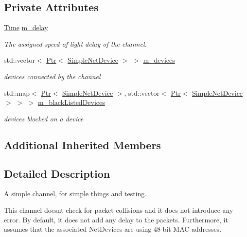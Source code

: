 \subsection*{Private Attributes}
\begin{DoxyCompactItemize}
\item 
\hyperlink{classns3_1_1Time}{Time} \hyperlink{classns3_1_1SimpleChannel_ada64a5f43714383448147d577bd8d619}{m\+\_\+delay}
\begin{DoxyCompactList}\small\item\em The assigned speed-\/of-\/light delay of the channel. \end{DoxyCompactList}\item 
std\+::vector$<$ \hyperlink{classns3_1_1Ptr}{Ptr}$<$ \hyperlink{classns3_1_1SimpleNetDevice}{Simple\+Net\+Device} $>$ $>$ \hyperlink{classns3_1_1SimpleChannel_a70203624f45f2aae03d9ae6294f6c4ce}{m\+\_\+devices}
\begin{DoxyCompactList}\small\item\em devices connected by the channel \end{DoxyCompactList}\item 
std\+::map$<$ \hyperlink{classns3_1_1Ptr}{Ptr}$<$ \hyperlink{classns3_1_1SimpleNetDevice}{Simple\+Net\+Device} $>$, std\+::vector$<$ \hyperlink{classns3_1_1Ptr}{Ptr}$<$ \hyperlink{classns3_1_1SimpleNetDevice}{Simple\+Net\+Device} $>$ $>$ $>$ \hyperlink{classns3_1_1SimpleChannel_aa50da357cc589209b13f7233d3b80898}{m\+\_\+black\+Listed\+Devices}
\begin{DoxyCompactList}\small\item\em devices blocked on a device \end{DoxyCompactList}\end{DoxyCompactItemize}
\subsection*{Additional Inherited Members}


\subsection{Detailed Description}
A simple channel, for simple things and testing. 

This channel doesn\textquotesingle{}t check for packet collisions and it does not introduce any error. By default, it does not add any delay to the packets. Furthermore, it assumes that the associated Net\+Devices are using 48-\/bit M\+AC addresses.

